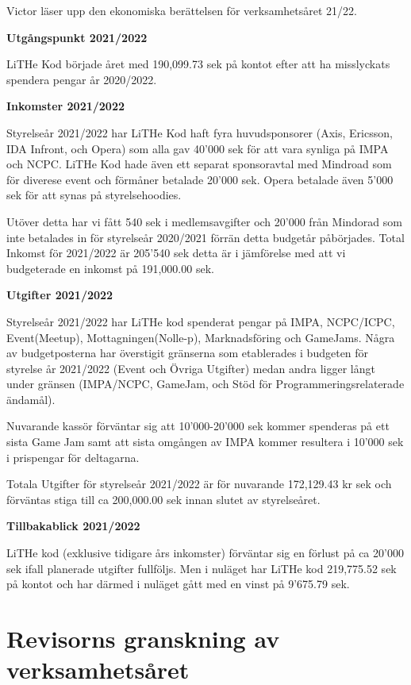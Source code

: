 \documentclass[a4paper]{article}
\newenvironment{quotationb}%
{\begin{leftbar}}%
{\end{leftbar}}
\begin{document}
Victor läser upp den ekonomiska berättelsen för verksamhetsåret 21/22.

\begin{quotationb}

\textbf{Utgångspunkt 2021/2022}

LiTHe Kod började året med 190,099.73 sek på kontot efter att ha
misslyckats spendera pengar år 2020/2022.

\textbf{Inkomster 2021/2022}

Styrelseår 2021/2022 har LiTHe Kod haft fyra huvudsponsorer (Axis,
Ericsson, IDA Infront, och Opera) som alla gav 40'000 sek för att vara
synliga på IMPA och NCPC. LiTHe Kod hade även ett separat sponsoravtal
med Mindroad som för diverese event och förmåner betalade 20'000
sek. Opera betalade även 5'000 sek för att synas på styrelsehoodies.

Utöver detta har vi fått 540 sek i medlemsavgifter och 20'000 från
Mindorad som inte betalades in för styrelseår 2020/2021 förrän detta
budgetår påbörjades. Total Inkomst för 2021/2022 är 205'540 sek detta
är i jämförelse med att vi budgeterade en inkomst på 191,000.00 sek.

\textbf{Utgifter 2021/2022}

Styrelseår 2021/2022 har LiTHe kod spenderat pengar på IMPA,
NCPC/ICPC, Event(Meetup), Mottagningen(Nolle-p), Marknadsföring och
GameJams. Några av budgetposterna har överstigit gränserna som
etablerades i budgeten för styrelse år 2021/2022 (Event och Övriga
Utgifter) medan andra ligger långt under gränsen (IMPA/NCPC, GameJam,
och Stöd för Programmeringsrelaterade ändamål).

 Nuvarande kassör förväntar sig att 10'000-20'000 sek kommer spenderas
på ett sista Game Jam samt att sista omgången av IMPA kommer resultera
i 10'000 sek i prispengar för deltagarna.

Totala Utgifter för styrelseår 2021/2022 är för nuvarande 172,129.43
kr sek och förväntas stiga till ca 200,000.00 sek innan slutet av
styrelseåret.

\textbf{Tillbakablick 2021/2022}

LiTHe kod (exklusive tidigare års inkomster) förväntar sig en förlust
på ca 20'000 sek ifall planerade utgifter fullföljs. Men i nuläget
har LiTHe kod 219,775.52 sek på kontot och har därmed i nuläget gått
med en vinst på 9'675.79 sek.

\end{quotationb}

\section{Revisorns granskning av verksamhetsåret}
\end{document}

